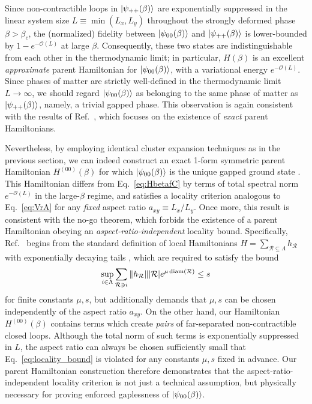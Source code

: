 \documentclass[aps,prl,twocolumn,floatfix,nofootinbib]{revtex4-2}
\theoremstyle{definition}
\DeclareMathOperator{\diam}{diam}
\begin{document}
Since non-contractible loops in $\ket{\psi_{++}(\beta)}$ are exponentially suppressed in the linear system size $L \equiv \min(L_{x}, L_{y})$ throughout the strongly deformed phase $\beta > \beta_{c}$, the (normalized) fidelity between $\ket{\psi_{00}(\beta)}$ and $\ket{\psi_{++}(\beta)}$ is lower-bounded by $1 - e^{-\mathcal{O}(L)}$ at large $\beta$. Consequently, these two states are indistinguishable from each other in the thermodynamic limit; in particular, $H(\beta)$ is an excellent \emph{approximate} parent Hamiltonian for $\ket{\psi_{00}(\beta)}$, with a variational energy $e^{-\mathcal{O}(L)}$. Since phases of matter are strictly well-defined in the thermodynamic limit $L \to \infty$, we should regard $\ket{\psi_{00}(\beta)}$ as belonging to the same phase of matter as $\ket{\psi_{++}(\beta)}$, namely, a trivial gapped phase. This observation is again consistent with the results of Ref.~, which focuses on the existence of \emph{exact} parent Hamiltonians. 


Nevertheless, by employing identical cluster expansion techniques as in the previous section, we can indeed construct an exact 1-form symmetric parent Hamiltonian $H^{(00)}(\beta)$ for which $\ket{\psi_{00}(\beta)}$ is the unique gapped ground state \cite{SOM}. This Hamiltonian differs from Eq.~\eqref{eq:HbetafC} by terms of total spectral norm $e^{-\mathcal{O}(L)}$ in the large-$\beta$ regime, and satisfies a locality criterion analogous to Eq.~\eqref{eq:VrA} for any \emph{fixed} aspect ratio $a_{xy} \equiv L_{x} / L_{y}$. Once more, this result is consistent with the no-go theorem, which forbids the existence of a parent Hamiltonian obeying an \emph{aspect-ratio-independent} locality bound. Specifically, Ref.~ begins from the standard definition of local Hamiltonians $H = \sum_{\mathcal{R} \subseteq \Lambda} h_{\mathcal{R}}$ with exponentially decaying tails \cite{HastingsKoma2006,hastings_locality_2010}, which are required to satisfy the bound \cite{fn4}
\begin{equation}
    \label{eq:locality_bound}
    \sup_{i \in \Lambda} \sum_{\mathcal{R} \ni i} \norm{h_{\mathcal{R}}} \abs{\mathcal{R}} e^{\mu \diam (\mathcal{R})} \leq s
\end{equation}
for finite constants $\mu, s$, but additionally demands that $\mu, s$ can be chosen independently of the aspect ratio $a_{xy}$. On the other hand, our Hamiltonian $H^{(00)}(\beta)$ contains terms which create \emph{pairs} of far-separated non-contractible closed loops. Although the total norm of such terms is exponentially suppressed in $L$, the aspect ratio can always be chosen sufficiently small that Eq.~\eqref{eq:locality_bound} is violated for any constants $\mu, s$ fixed in advance. Our parent Hamiltonian construction therefore demonstrates that the aspect-ratio-independent locality criterion is not just a technical assumption, but physically necessary for proving enforced gaplessness of $\ket{\psi_{00}(\beta)}$.
\end{document}
